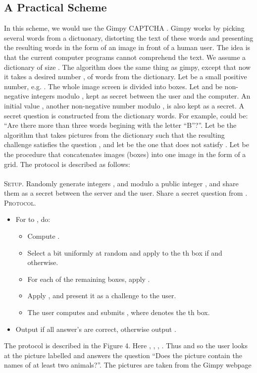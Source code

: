 \documentclass{llncs}
\begin{document}
\subsection{A Practical Scheme}
In this scheme, we would use the Gimpy CAPTCHA \cite{gimpy}. Gimpy works by picking several words from a dictuonary, distorting the text of these words and presenting the resulting words in the form of an image in front of a human user. The idea is that the current computer programs cannot comprehend the text. We assume a dictionary of size . The algorithm  does the same thing as gimpy, except that now it takes a desired number , of words from the dictionary. Let  be a small positive number, e.g. . The whole image screen is divided into  boxes. Let  and  be non-negative integers modulo , kept as secret between the user and the computer. An initial value , another non-negative number modulo , is also kept as a secret. A secret question  is constructed from the dictionary words. For example,  could be: ``Are there more than three words begining with the letter ``B''?''. Let   be the algorithm that takes  pictures from the dictionary such that the resulting challenge satisfies the question , and let  be the one that does not satisfy . Let  be the procedure that concatenates  images (boxes) into one image in the form of a grid. The protocol is described as follows:\\\\
\textsc{Setup.} Randomly generate integers ,  and  modulo a public integer , and share them as a secret between the server and the user. Share a secret question  from .\\
\textsc{Protocol.}
\begin{itemize}
\item For  to , do:
	\begin{itemize}
	\item Compute .
	\item Select a bit  uniformly at random and apply  to the th box if  and  otherwise. 
	\item For each of the remaining boxes, apply . 
	\item Apply , and present it as a challenge to the user.
	\item The user computes  and submits , where  denotes the th box.
	\end{itemize}
\item Output  if all answer's are correct, otherwise output .
\end{itemize}
The protocol is described in the Figure 4. Here , , , . Thus  and so the user looks at the picture labelled  and answers the question ``Does the picture contain the names of at least two animals?''. The pictures are taken from the Gimpy webpage \cite{gimpy}
\end{document}
